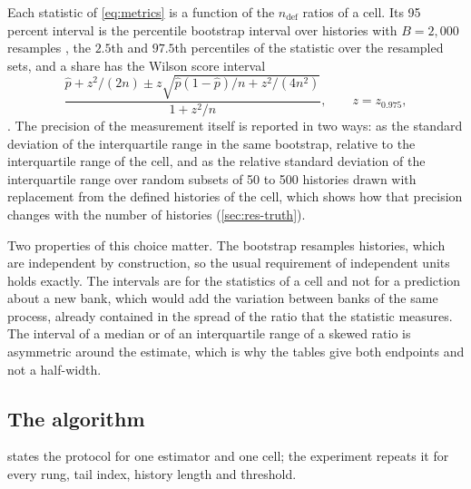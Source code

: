 Each statistic of \cref{eq:metrics} is a function of the $n_{\mathrm{def}}$ ratios of a cell. Its 95 percent interval is the percentile bootstrap interval over histories with $B=2{,}000$ resamples \citep{efron1979,diciccio1996}, the $2.5$th and $97.5$th percentiles of the statistic over the resampled sets, and a share has the Wilson score interval
\begin{equation}
\frac{\hat p+z^2/(2n)\pm z\sqrt{\hat p(1-\hat p)/n+z^2/(4n^2)}}{1+z^2/n},\qquad z=z_{0.975},
\label{eq:wilson}
\end{equation}
\citep{wilson1927}. The precision of the measurement itself is reported in two ways: as the standard deviation of the interquartile range in the same bootstrap, relative to the interquartile range of the cell, and as the relative standard deviation of the interquartile range over random subsets of 50 to 500 histories drawn with replacement from the defined histories of the cell, which shows how that precision changes with the number of histories (\cref{sec:res-truth}).

Two properties of this choice matter. The bootstrap resamples histories, which are independent by construction, so the usual requirement of independent units holds exactly. The intervals are for the statistics of a cell and not for a prediction about a new bank, which would add the variation between banks of the same process, already contained in the spread of the ratio that the statistic measures. The interval of a median or of an interquartile range of a skewed ratio is asymmetric around the estimate, which is why the tables give both endpoints and not a half-width.

\subsection{The algorithm}
\label{sec:pm-algorithm}

 states the protocol for one estimator and one cell; the experiment repeats it for every rung, tail index, history length and threshold.

